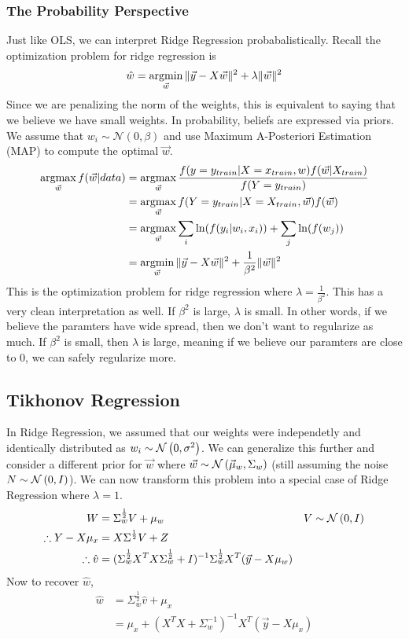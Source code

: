\subsubsection{The Probability Perspective}
Just like OLS, we can interpret Ridge Regression probabalistically. Recall the optimization problem for ridge regression is
\[
  \hat{w} = \operatorname*{argmin}_{\vec{w}} \|\vec{y} - X\vec{w}\|^2 + \lambda \|\vec{w}\|^2
\]
Since we are penalizing the norm of the weights, this is equivalent to saying that we believe we have small weights. In probability, beliefs are expressed via priors. We assume that $w_i\sim\mathcal{N}(0, \beta)$ and use Maximum A-Posteriori Estimation (MAP) to compute the optimal $\vec{w}$.
\begin{align*}
  \operatorname*{argmax}_{\vec{w}}f(\vec{w}|data) &= \operatorname*{argmax}_{\vec{w}}\frac{f(y=y_{train}|X=x_{train}, w)f(\vec{w}|X_{train})}{f(Y=y_{train})}\\
  &= \operatorname*{argmax}_{\vec{w}} f(Y=y_{train}|X=X_{train}, \vec{w})f(\vec{w})\\
  &= \operatorname*{argmax}_{\vec{w}}\sum_i\ln(f(y_i|w_i, x_i))+\sum_j\ln(f(w_j))\\
    &= \operatorname*{argmin}_{\vec{w}} \|\vec{y}-X\vec{w}\|^2+\frac{1}{\beta^2}\|\vec{w}\|^2
\end{align*}
This is the optimization problem for ridge regression where $\lambda=\frac{1}{\beta^2}$. This has a very clean interpretation as well. If $\beta^2$ is large, $\lambda$ is small. In other words, if we believe the paramters have wide spread, then we don't want to regularize as much. If $\beta^2$ is small, then $\lambda$ is large, meaning if we believe our paramters are close to 0, we can safely regularize more.
\subsection{Tikhonov Regression}
In Ridge Regression, we assumed that our weights were independetly and identically distributed as $w_i\sim\mathcal{N}\left(0, \sigma^2\right)$. We can generalize this further and consider a different prior for $\vec{w}$ where $\vec{w}\sim\mathcal{N}\left(\vec{\mu}_w, \Sigma_w\right)$ (still assuming the noise $N\sim\mathcal{N}\left(0, I\right)$).
We can now transform this problem into a special case of Ridge Regression where $\lambda=1$.
\begin{align*}
  W &= \Sigma_w^{\frac{1}{2}}V+\mu_w & V\sim\mathcal{N}\left(0, I\right)\\
  \therefore Y - X\mu_x &= X\Sigma^{\frac{1}{2}}V+Z\\
  \therefore \hat{v} &= (\Sigma_w^{\frac{1}{2}}X^TX\Sigma_w^{\frac{1}{2}} + I)^{-1}\Sigma_w^{\frac{1}{2}}X^T(\vec{y}-X\mu_w)
\end{align*}
Now to recover $\hat{w}$,
\begin{align*}
  \hat{w} &= \Sigma_w^{\frac{1}{2}}\hat{v}+\mu_x\\
  &= \mu_x + (X^TX+\Sigma_w^{-1})^{-1}X^T(\vec{y}-X\mu_x)
\end{align*}
